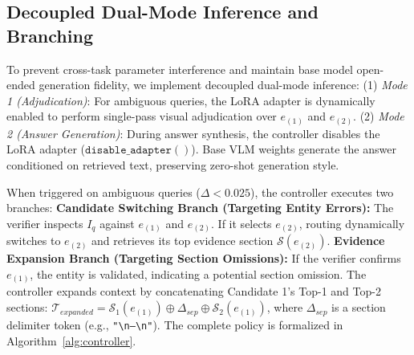 \documentclass[conference]{IEEEtran}
\begin{document}
\subsection{Decoupled Dual-Mode Inference and Branching}
To prevent cross-task parameter interference and maintain base model open-ended generation fidelity, we implement decoupled dual-mode inference:
(1) \textit{Mode 1 (Adjudication)}: For ambiguous queries, the LoRA adapter is dynamically enabled to perform single-pass visual adjudication over $e_{(1)}$ and $e_{(2)}$.
(2) \textit{Mode 2 (Answer Generation)}: During answer synthesis, the controller disables the LoRA adapter ($\mathtt{disable\_adapter()}$). Base VLM weights generate the answer conditioned on retrieved text, preserving zero-shot generation style.

When triggered on ambiguous queries ($\Delta < 0.025$), the controller executes two branches:
\textbf{Candidate Switching Branch (Targeting Entity Errors):} The verifier inspects $I_q$ against $e_{(1)}$ and $e_{(2)}$. If it selects $e_{(2)}$, routing dynamically switches to $e_{(2)}$ and retrieves its top evidence section $\mathcal{S}(e_{(2)})$.
\textbf{Evidence Expansion Branch (Targeting Section Omissions):} If the verifier confirms $e_{(1)}$, the entity is validated, indicating a potential section omission. The controller expands context by concatenating Candidate 1's Top-1 and Top-2 sections: $\mathcal{T}_{expanded} = \mathcal{S}_1(e_{(1)}) \oplus \Delta_{sep} \oplus \mathcal{S}_2(e_{(1)})$, where $\Delta_{sep}$ is a section delimiter token (e.g., \texttt{"\textbackslash n---\textbackslash n"}). The complete policy is formalized in Algorithm~\ref{alg:controller}.
\end{document}

